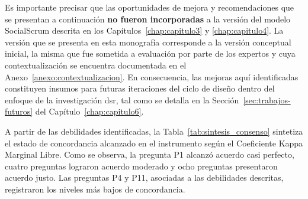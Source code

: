 Es importante precisar que las oportunidades de mejora y recomendaciones que se presentan a continuación \textbf{no fueron incorporadas} a la versión del modelo SocialScrum descrita en los Capítulos~\ref{chap:capitulo3} y \ref{chap:capitulo4}. La versión que se presenta en esta monografía corresponde a la versión conceptual inicial, la misma que fue sometida a evaluación por parte de los expertos y cuya contextualización se encuentra documentada en el Anexo~\ref{anexo:contextualizacion}. En consecuencia, las mejoras aquí identificadas constituyen insumos para futuras iteraciones del ciclo de diseño dentro del enfoque de la investigación \gls{dsr}, tal como se detalla en la Sección~\ref{sec:trabajos-futuros} del Capítulo~\ref{chap:capitulo6}.

A partir de las debilidades identificadas, la Tabla~\ref{tab:sintesis_consenso} sintetiza el estado de concordancia alcanzado en el instrumento según el Coeficiente Kappa Marginal Libre. Como se observa, la pregunta P1 alcanzó acuerdo casi perfecto, cuatro preguntas lograron acuerdo moderado y ocho preguntas presentaron acuerdo justo. Las preguntas P4 y P11, asociadas a las debilidades descritas, registraron los niveles más bajos de concordancia.

\begingroup
\scriptsize
\renewcommand{\arraystretch}{1.4}
\setlength{\tabcolsep}{3pt}
\setlength{\LTleft}{0pt}
\setlength{\LTright}{0pt}

